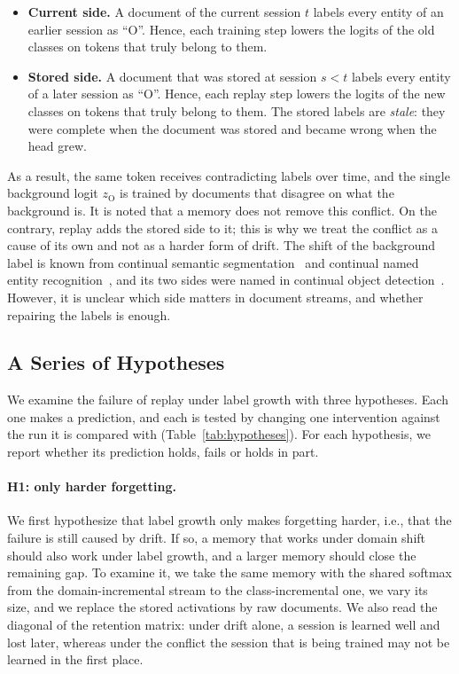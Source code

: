 \begin{itemize}
  \item \textbf{Current side.} A document of the current session $t$ labels every entity of
        an earlier session as ``O''. Hence, each training step lowers the logits of the old
        classes on tokens that truly belong to them.
  \item \textbf{Stored side.} A document that was stored at session $s<t$ labels every entity
        of a later session as ``O''. Hence, each replay step lowers the logits of the new
        classes on tokens that truly belong to them. The stored labels are \emph{stale}: they
        were complete when the document was stored and became wrong when the head grew.
\end{itemize}

\noindent As a result, the same token receives contradicting labels over time, and the
single background logit $z_{\mathrm{O}}$ is trained by documents that disagree on what the
background is. It is noted that a memory does not remove this conflict. On the contrary,
replay adds the stored side to it; this is why we treat the conflict as a cause of its own
and not as a harder form of drift. The shift of the background label is known from continual
semantic segmentation~\citep{cermelli2020mib} and continual named entity
recognition~\citep{zhang2023cpfd,ma2023learning}, and its two sides were named in continual
object detection~\citep{liu2023abr,mo2024bpf}. However, it is unclear which side matters in
document streams, and whether repairing the labels is enough.

\subsection{A Series of Hypotheses}
\label{sec:m-hypotheses}

We examine the failure of replay under label growth with three hypotheses. Each one makes a
prediction, and each is tested by changing one intervention against the run it is compared
with (Table~\ref{tab:hypotheses}). For each hypothesis, we report whether its prediction
holds, fails or holds in part.

\paragraph{H1: only harder forgetting.} We first hypothesize that label growth only makes
forgetting harder, i.e., that the failure is still caused by drift. If so, a memory that
works under domain shift should also work under label growth, and a larger memory should
close the remaining gap. To examine it, we take the same memory with the shared softmax from
the domain-incremental stream to the class-incremental one, we vary its size, and we replace
the stored activations by raw documents. We also read the diagonal of the retention matrix:
under drift alone, a session is learned well and lost later, whereas under the conflict the
session that is being trained may not be learned in the first place.

